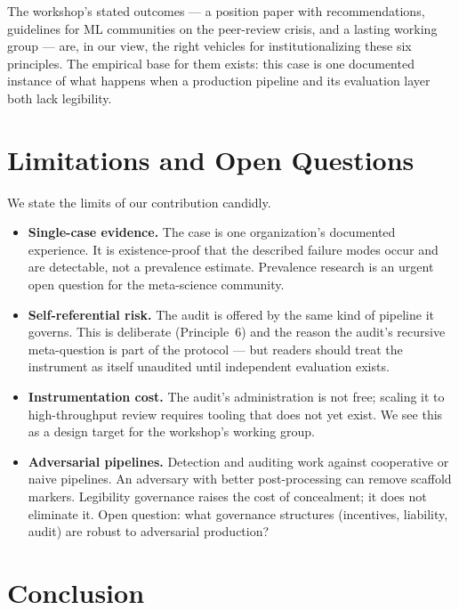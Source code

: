 \documentclass{article}
\begin{document}
The workshop's stated outcomes --- a position paper with recommendations, guidelines for ML communities on the peer-review crisis, and a lasting working group --- are, in our view, the right vehicles for institutionalizing these six principles. The empirical base for them exists: this case is one documented instance of what happens when a production pipeline and its evaluation layer both lack legibility.

\section{Limitations and Open Questions}
\label{sec:limits}

We state the limits of our contribution candidly.

\begin{itemize}
\item \textbf{Single-case evidence.} The case is one organization's documented experience. It is existence-proof that the described failure modes occur and are detectable, not a prevalence estimate. Prevalence research is an urgent open question for the meta-science community.
\item \textbf{Self-referential risk.} The audit is offered by the same kind of pipeline it governs. This is deliberate (Principle~6) and the reason the audit's recursive meta-question is part of the protocol --- but readers should treat the instrument as itself unaudited until independent evaluation exists.
\item \textbf{Instrumentation cost.} The audit's administration is not free; scaling it to high-throughput review requires tooling that does not yet exist. We see this as a design target for the workshop's working group.
\item \textbf{Adversarial pipelines.} Detection and auditing work against cooperative or naive pipelines. An adversary with better post-processing can remove scaffold markers. Legibility governance raises the cost of concealment; it does not eliminate it. Open question: what governance structures (incentives, liability, audit) are robust to adversarial production?
\end{itemize}

\section{Conclusion}
\label{sec:conclusion}
\end{document}
